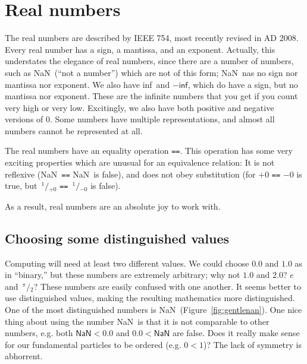 \documentclass[twocolumn,cm]{article}
\newcommand\sfrac[2]{\!{}\,^{#1}\!/{}\!_{#2}}
\newcommand\nan{\textsf{NaN}}
\renewcommand\inf{\textsf{inf}}
\begin{document}
\section{Real numbers}
The real numbers are described by IEEE 754, most recently revised in
AD 2008\cite{ieee754}. Every real number has a sign, a mantissa, and an
exponent. Actually, this understates the elegance of real numbers,
since there are a number of numbers, such as \nan\ (``not a number'')
which are not of this form; \nan\ nas no sign nor mantissa nor
exponent. We also have \inf\ and $-\inf$, which do have a sign, but no
mantissa nor exponent. These are the infinite numbers that you get if
you count very high or very low. Excitingly, we also have both
positive and negative versions of 0. Some numbers have multiple
representations, and almost all numbers cannot be represented at all.

The real numbers have an equality operation {\tt ==}. This operation
has some very exciting properties which are unusual for an equivalence
relation: It is not reflexive (\nan\ {\tt ==} \nan\ is false), and
does not obey substitution (for $+0$ {\tt ==} $-0$ is true, but
$\sfrac{1}{+0}$ {\tt ==} $\sfrac{1}{-0}$ is false).

As a result, real numbers are an absolute joy to work with.

\subsection{Choosing some distinguished values} \label{sec:distinguished}

Computing will need at least two different values. We could choose
$0.0$ and $1.0$ as in ``binary,'' but these numbers are extremely
arbitrary; why not $1.0$ and $2.0$? $e$ and $\sfrac{\pi}{2}$? These
numbers are easily confused with one another. It seems better to use
distinguished values, making the resulting mathematics more
distinguished. One of the most distinguished numbers is
\nan\ (Figure~\ref{fig:gentlenan}). One nice thing about using the
number \nan\ is that it is not comparable to other numbers, e.g. both
$\nan < 0.0$ and $0.0 < \nan$ are false. Does it really make sense for
our fundamental particles to be ordered (e.g. $0 < 1$)? The lack of
symmetry is abhorrent.
\end{document}
